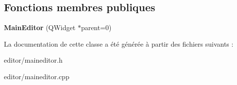 \subsection*{Fonctions membres publiques}
\begin{DoxyCompactItemize}
\item 
\hypertarget{classMainEditor_a58a308ba8043e53ea5525e87540b0a71}{{\bfseries Main\+Editor} (Q\+Widget $\ast$parent=0)}\label{classMainEditor_a58a308ba8043e53ea5525e87540b0a71}

\end{DoxyCompactItemize}


La documentation de cette classe a été générée à partir des fichiers suivants \+:\begin{DoxyCompactItemize}
\item 
editor/maineditor.\+h\item 
editor/maineditor.\+cpp\end{DoxyCompactItemize}
